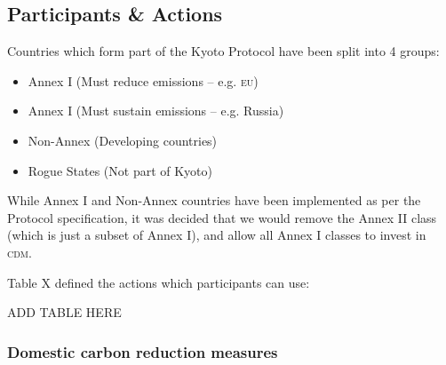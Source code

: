 \subsection{Participants \& Actions}
Countries which form part of the Kyoto Protocol have been split into 4 groups:

\begin{itemize}
	\item{Annex I (Must reduce emissions -- e.g. \textsc{eu})}
	\item{Annex I (Must sustain emissions -- e.g. Russia)}
	\item{Non-Annex (Developing countries)}
	\item{Rogue States (Not part of Kyoto)}
\end{itemize}

While Annex I and Non-Annex countries have been implemented as per the Protocol specification, it was decided that we would remove the Annex II class (which is just a subset of Annex I), and allow all Annex I classes to invest in \textsc{cdm}.

Table X defined the actions which participants can use:

\begin{center}
ADD TABLE HERE
\end{center}

\subsubsection{Domestic carbon reduction measures}

